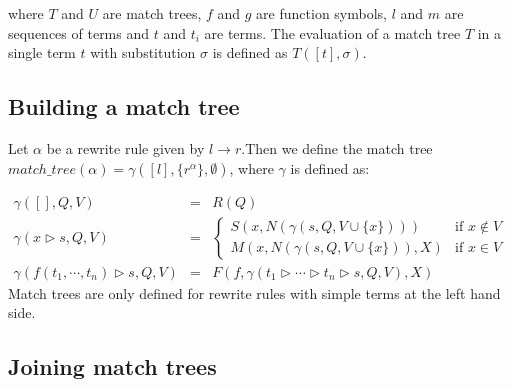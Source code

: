 \documentclass{article}
\begin{document}
where $T$ and $U$ are match trees, $f$ and $g$ are function symbols, $l$ and 
$m$ are sequences of terms and $t$ and $t_{i}$ are terms. The evaluation of
a match tree $T$ in a single term $t$ with substitution $\sigma $ is defined
as $T([t],\sigma )$.

\subsection{Building a match tree}

Let $\alpha $ be a rewrite rule given by $l\rightarrow r$.Then we define the
match tree $match\_tree(\alpha )=\gamma ([l],\{r^{\alpha }\},\emptyset )$,
where $\gamma $ is defined as:

\begin{equation*}
\begin{array}{lll}
\gamma ([],Q,V) & = & R(Q) \\ 
\gamma (x\rhd s,Q,V) & = & \left\{ 
\begin{array}{ll}
S(x,N(\gamma (s,Q,V\cup \{x\}))) & \text{if }x\notin V \\ 
M(x,N(\gamma (s,Q,V\cup \{x\})),X) & \text{if }x\in V%
\end{array}%
\right. \\ 
\gamma (f(t_{1},\cdots ,t_{n})\rhd s,Q,V) & = & F(f,\gamma (t_{1}\rhd \cdots
\rhd t_{n}\rhd s,Q,V),X)%
\end{array}%
\end{equation*}%
Match trees are only defined for rewrite rules with simple terms at the left
hand side.

\subsection{Joining match trees}
\end{document}
